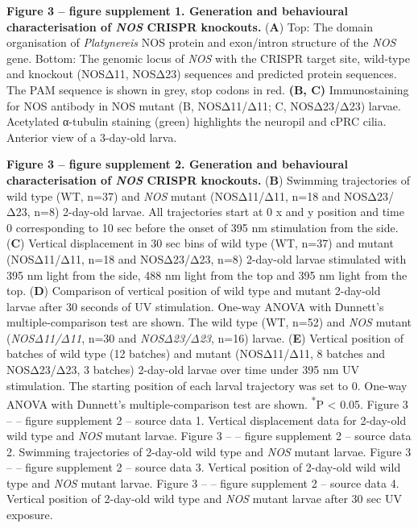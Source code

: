 \documentclass[
  11pt,
  letterpaper,
  DIV=11,
  numbers=noendperiod]{scrartcl}
\begin{document}
\textbf{Figure 3 -- figure supplement 1. Generation and behavioural
characterisation of \emph{NOS} CRISPR knockouts.} (\textbf{A}) Top: The
domain organisation of \emph{Platynereis} NOS protein and exon/intron
structure of the \emph{NOS} gene. Bottom: The genomic locus of
\emph{NOS} with the CRISPR target site, wild-type and knockout (NOSΔ11,
NOSΔ23) sequences and predicted protein sequences. The PAM sequence is
shown in grey, stop codons in red. \textbf{(B, C)} Immunostaining for
NOS antibody in NOS mutant (B, NOSΔ11/Δ11; C, NOSΔ23/Δ23) larvae.
Acetylated α-tubulin staining (green) highlights the neuropil and cPRC
cilia. Anterior view of a 3-day-old larva.

\textbf{Figure 3 -- figure supplement 2. Generation and behavioural
characterisation of \emph{NOS} CRISPR knockouts.} (\textbf{B}) Swimming
trajectories of wild type (WT, n=37) and \emph{NOS} mutant (NOSΔ11/Δ11,
n=18 and NOSΔ23/Δ23, n=8) 2-day-old larvae. All trajectories start at 0
x and y position and time 0 corresponding to 10 sec before the onset of
395 nm stimulation from the side. (\textbf{C}) Vertical displacement in
30 sec bins of wild type (WT, n=37) and mutant (NOSΔ11/Δ11, n=18 and
NOSΔ23/Δ23, n=8) 2-day-old larvae stimulated with 395 nm light from the
side, 488 nm light from the top and 395 nm light from the top.
(\textbf{D}) Comparison of vertical position of wild type and mutant
2-day-old larvae after 30 seconds of UV stimulation. One-way ANOVA with
Dunnett's multiple-comparison test are shown. The wild type (WT, n=52)
and \emph{NOS} mutant (\emph{NOSΔ11/Δ11}, n=30 and \emph{NOSΔ23/Δ23},
n=16) larvae. (\textbf{E}) Vertical position of batches of wild type (12
batches) and mutant (NOSΔ11/Δ11, 8 batches and NOSΔ23/Δ23, 3 batches)
2-day-old larvae over time under 395 nm UV stimulation. The starting
position of each larval trajectory was set to 0. One-way ANOVA with
Dunnett's multiple-comparison test are shown. \textsuperscript{*}P
\textless{} 0.05. Figure 3 -- -- figure supplement 2 -- source data 1.
Vertical displacement data for 2-day-old wild type and \emph{NOS} mutant
larvae. Figure 3 -- -- figure supplement 2 -- source data 2. Swimming
trajectories of 2-day-old wild type and \emph{NOS} mutant larvae. Figure
3 -- -- figure supplement 2 -- source data 3. Vertical position of
2-day-old wild wild type and \emph{NOS} mutant larvae. Figure 3 -- --
figure supplement 2 -- source data 4. Vertical position of 2-day-old
wild type and \emph{NOS} mutant larvae after 30 sec UV exposure.
\end{document}
